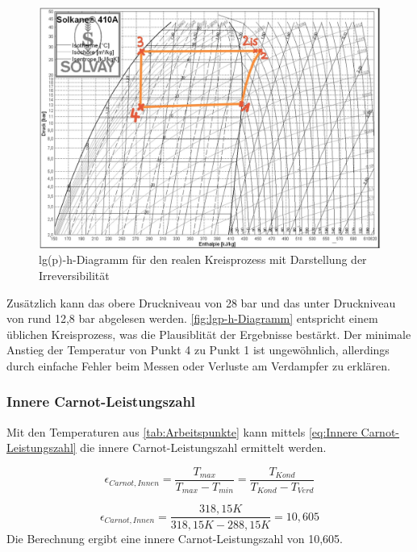     \begin{figure}[!h]
        \centering
        \includegraphics[width=\textwidth]{Abbildungen/lgp-h-diagramm.jpg}
        \caption{lg(p)-h-Diagramm für den realen Kreisprozess mit Darstellung der Irreversibilität}
        \label{fig:lgp-h-Diagramm}
    \end{figure}


    Zusätzlich kann das obere Druckniveau von 28 bar und das unter Druckniveau von rund 12,8 bar abgelesen werden.
    \autoref{fig:lgp-h-Diagramm} entspricht einem üblichen Kreisprozess, was die Plausiblität der Ergebnisse bestärkt. 
    Der minimale Anstieg der Temperatur von Punkt 4 zu Punkt 1 ist ungewöhnlich, allerdings durch einfache Fehler beim Messen oder Verluste am Verdampfer zu erklären.\\
\newpage
\subsubsection{Innere Carnot-Leistungszahl}
Mit den Temperaturen aus \autoref{tab:Arbeitspunkte} kann mittels \autoref{eq:Innere Carnot-Leistungszahl} die innere Carnot-Leistungszahl
ermittelt werden. 

    \begin{equation}
        \epsilon_{Carnot, Innen}=\frac{T_{max}}{T_{max}-T_{min}}=\frac{T_{Kond}}{T_{Kond}-T_{Verd}}
        \label{eq:Innere Carnot-Leistungszahl}
    \end{equation}

$$\epsilon_{Carnot, Innen}=\frac{318,15 K}{318,15 K-288,15 K}=10,605$$
Die Berechnung ergibt eine innere Carnot-Leistungszahl von 10,605.

